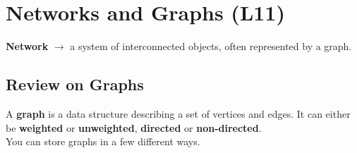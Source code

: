 \documentclass[english, 10pt]{article}
\begin{document}
\section{Networks and Graphs (L11)}

\begin{tcolorbox}[title=Definition:,colframe=red!75!black,colback=red!5!white,arc=0pt,fonttitle=\bfseries]
\textbf{Network} $\rightarrow$ a system of interconnected objects, often represented by a graph.
\end{tcolorbox}

\subsection{Review on Graphs}

A \textbf{graph} is a data structure describing a set of vertices and edges. It can either be \textbf{weighted} or \textbf{unweighted}, \textbf{directed} or \textbf{non-directed}.\\

You can store graphs in a few different ways.\\
\end{document}
